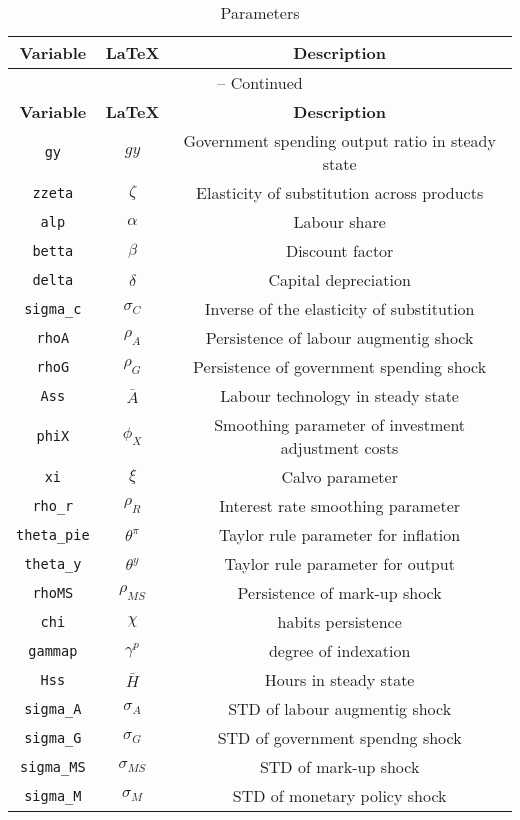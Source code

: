 \begin{center}
\begin{longtable}{ccc}
\caption{Parameters}\\%
\hline%
\multicolumn{1}{c}{\textbf{Variable}} &
\multicolumn{1}{c}{\textbf{\LaTeX}} &
\multicolumn{1}{c}{\textbf{Description}}\\%
\hline\hline%
\endfirsthead
\multicolumn{3}{c}{{\tablename} \thetable{} -- Continued}\\%
\hline%
\multicolumn{1}{c}{\textbf{Variable}} &
\multicolumn{1}{c}{\textbf{\LaTeX}} &
\multicolumn{1}{c}{\textbf{Description}}\\%
\hline\hline%
\endhead
\texttt{gy} & ${gy}$ & Government spending output ratio in steady state\\
\texttt{zzeta} & ${\zeta}$ & Elasticity of substitution across products\\
\texttt{alp} & ${\alpha}$ & Labour share\\
\texttt{betta} & ${\beta}$ & Discount factor\\
\texttt{delta} & ${\delta}$ & Capital depreciation\\
\texttt{sigma\_c} & ${\sigma_{C}}$ & Inverse of the elasticity of substitution\\
\texttt{rhoA} & ${\rho_{A}}$ & Persistence of labour augmentig shock\\
\texttt{rhoG} & ${\rho_{G}}$ & Persistence of government spending shock\\
\texttt{Ass} & ${\bar{A}}$ & Labour technology in steady state\\
\texttt{phiX} & ${\phi_{X}}$ & Smoothing parameter of investment adjustment costs\\
\texttt{xi} & ${\xi}$ & Calvo parameter\\
\texttt{rho\_r} & ${\rho_{R}}$ & Interest rate smoothing parameter\\
\texttt{theta\_pie} & $\theta^{\pi}$ & Taylor rule parameter for inflation\\
\texttt{theta\_y} & $\theta^{y}$ & Taylor rule parameter for output\\
\texttt{rhoMS} & ${\rho_{MS}}$ & Persistence of mark-up shock\\
\texttt{chi} & ${\chi}$ & habits persistence\\
\texttt{gammap} & ${\gamma^{p}}$ & degree of indexation\\
\texttt{Hss} & ${\bar{H}}$ & Hours in steady state\\
\texttt{sigma\_A} & ${\sigma_{A}}$ & STD of labour augmentig shock\\
\texttt{sigma\_G} & ${\sigma_{G}}$ & STD of government spendng shock\\
\texttt{sigma\_MS} & ${\sigma_{MS}}$ & STD of mark-up shock\\
\texttt{sigma\_M} & ${\sigma_{M}}$ & STD of monetary policy shock\\
\hline%
\end{longtable}
\end{center}
